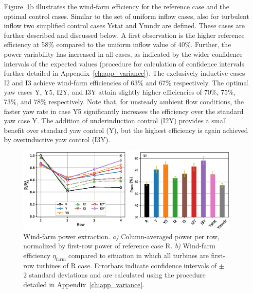 	Figure~\ref{fig:power_turb}b illustrates the wind-farm efficiency for the reference case and the optimal control cases. Similar to the set of uniform inflow cases, also for turbulent inflow two simplified control cases Ystat and Ymndr are defined. These cases are further described and discussed below. A first observation is the higher reference efficiency at 58\% compared to the uniform inflow value of 40\%. Further, the power variability has increased in all cases, as indicated by the wider confidence intervals of the expected values (procedure for calculation of confidence intervals further detailed in Appendix~\ref{ch:app_variance}). The exclusively inductive cases I2 and I3 achieve wind-farm efficiencies of 63\% and 67\% respectively. The optimal yaw cases Y, Y5, I2Y, and I3Y attain slightly higher efficiencies of 70\%, 75\%, 73\%, and 78\% respectively. Note that, for unsteady ambient flow conditions, the faster yaw rate in case Y5 significantly increases the efficiency over the standard yaw case Y. The addition of underinduction control (I2Y) provides a small benefit over standard yaw control (Y), but the highest efficiency is again achieved by overinductive yaw control (I3Y). 
	
	\begin{figure}
		\includegraphics[width=\textwidth]{chapters/optimal_yaw_control/power_row_turb_eff.eps}
		\caption[Wind-farm power extraction for turbulent inflow.]{Wind-farm power extraction. \emph{a) } Column-averaged power per row, normalized by first-row power of reference case R. \emph{b) } Wind-farm efficiency $\eta_{\text{farm}}$ compared to situation in which all turbines are first-row turbines of R case. Errorbars indicate confidence intervals of $\pm$ 2 standard deviations and are calculated using the procedure detailed in Appendix~\ref{ch:app_variance}. \label{fig:power_turb}}
	\end{figure}
	
